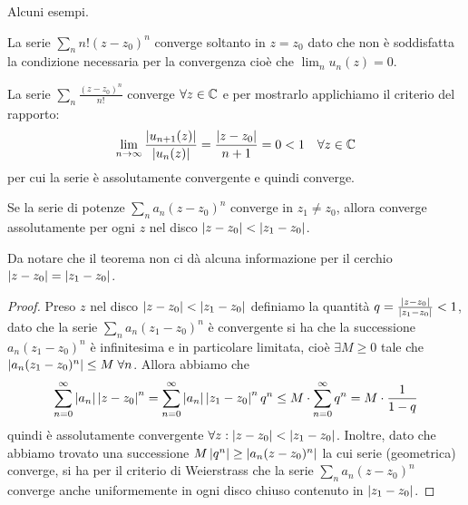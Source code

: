 Alcuni esempi. 
\begin{example}
  La serie $ \sum_n n! (z - z_0)^n $ converge soltanto in $ z = z_0 $ dato che non è soddisfatta la condizione necessaria per la convergenza 
  cioè che $ \lim_n u_n(z) = 0 $.
\end{example}

\begin{example}
  La serie $ \sum_n \frac{(z - z_0)^n}{n!} $ converge $ \forall z \in \mathbb{C} $ e per mostrarlo applichiamo il 
  criterio del rapporto:
  \begin{align}
    \lim_{n\to \infty} \frac{\left|{u_{n+1}(z)}\right|}{\left|{u_n(z)}\right|} = \frac{\left|{z - z_0}\right|}{n+1} = 0 < 1 \quad \forall z \in \mathbb{C}
  \end{align}
  per cui la serie è assolutamente convergente e quindi converge.
\end{example}

\begin{theorem}[ di Abel ]
  Se la serie di potenze $ \sum_n a_n (z - z_0)^n $ converge in $ z_1 \neq z_0 $, allora converge assolutamente per ogni $ z $ nel disco 
  $ \left|{z - z_0}\right| < \left|{z_1 - z_0}\right|  $.
\end{theorem}
Da notare che il teorema non ci dà alcuna informazione per il cerchio $ \left|{z - z_0}\right| = \left|{z_1 - z_0}\right| $.
\begin{proof}
  Preso $ z $ nel disco $ \left|{z - z_0}\right| < \left|{z_1 - z_0}\right| $ definiamo la quantità $ q = \frac{\left|{z - z_0}\right|}{\left|{z_1 - z_0}\right|} < 1 $, dato che la serie 
  $ \sum_n a_n (z_1 - z_0)^n $ è convergente si ha che la successione $ a_n (z_1 - z_0)^n $ è infinitesima e in particolare limitata, cioè 
  $ \exists M \geq 0  $ tale che $ \left|{a_n (z_1 - z_0)^n}\right| \leq M \; \forall n $. Allora abbiamo che 
  \begin{align}
    \sum_{n = 0}^\infty \left|{a_n}\right| \left|{z - z_0}\right|^n = \sum_{n = 0}^\infty \left|{a_n}\right| \left|{z_1 - z_0}\right|^n q^n \leq
    M \cdot \sum_{n = 0}^\infty q^n = M \cdot \frac1{1 - q}
  \end{align}
  quindi è assolutamente convergente $ \forall z : \left|{z - z_0}\right| < \left|{z_1 - z_0}\right| $. Inoltre, dato che abbiamo trovato una successione 
  $ M \left|{q^n}\right| \geq \left|{a_n (z - z_0)^n}\right| $ la cui serie (geometrica) converge, si ha per il criterio di Weierstrass che la serie 
  $ \sum_n a_n (z - z_0)^n $ converge anche uniformemente in ogni disco chiuso contenuto in $ \left|{z_1 - z_0}\right| $.
\end{proof}

